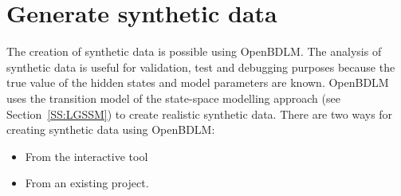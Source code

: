\section{Generate synthetic data}
\label{S:SYNTHETIC}
The creation of synthetic data is possible using OpenBDLM.
The analysis of synthetic data is useful for validation, test and debugging purposes because the true value of the hidden states and model parameters are known.
OpenBDLM uses the transition model  of the state-space modelling approach (see Section~\ref{SS:LGSSM}) to create realistic synthetic data.
There are two ways for creating synthetic data using OpenBDLM:

\begin{itemize}
\item From the interactive tool
\item From an existing project.
\end{itemize}

